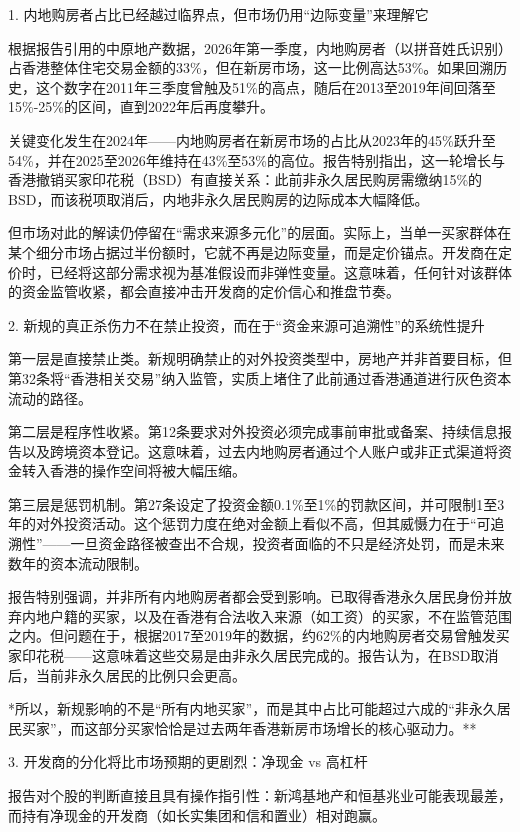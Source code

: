 \documentclass[11pt]{ctexart}
\begin{document}
1. 内地购房者占比已经越过临界点，但市场仍用“边际变量”来理解它

根据报告引用的中原地产数据，2026年第一季度，内地购房者（以拼音姓氏识别）占香港整体住宅交易金额的33\%，但在新房市场，这一比例高达53\%。如果回溯历史，这个数字在2011年三季度曾触及51\%的高点，随后在2013至2019年间回落至15\%-25\%的区间，直到2022年后再度攀升。

关键变化发生在2024年——内地购房者在新房市场的占比从2023年的45\%跃升至54\%，并在2025至2026年维持在43\%至53\%的高位。报告特别指出，这一轮增长与香港撤销买家印花税（BSD）有直接关系：此前非永久居民购房需缴纳15\%的BSD，而该税项取消后，内地非永久居民购房的边际成本大幅降低。

但市场对此的解读仍停留在“需求来源多元化”的层面。实际上，当单一买家群体在某个细分市场占据过半份额时，它就不再是边际变量，而是定价锚点。开发商在定价时，已经将这部分需求视为基准假设而非弹性变量。这意味着，任何针对该群体的资金监管收紧，都会直接冲击开发商的定价信心和推盘节奏。

2. 新规的真正杀伤力不在禁止投资，而在于“资金来源可追溯性”的系统性提升

第一层是直接禁止类。新规明确禁止的对外投资类型中，房地产并非首要目标，但第32条将“香港相关交易”纳入监管，实质上堵住了此前通过香港通道进行灰色资本流动的路径。

第二层是程序性收紧。第12条要求对外投资必须完成事前审批或备案、持续信息报告以及跨境资本登记。这意味着，过去内地购房者通过个人账户或非正式渠道将资金转入香港的操作空间将被大幅压缩。

第三层是惩罚机制。第27条设定了投资金额0.1\%至1\%的罚款区间，并可限制1至3年的对外投资活动。这个惩罚力度在绝对金额上看似不高，但其威慑力在于“可追溯性”——一旦资金路径被查出不合规，投资者面临的不只是经济处罚，而是未来数年的资本流动限制。

报告特别强调，并非所有内地购房者都会受到影响。已取得香港永久居民身份并放弃内地户籍的买家，以及在香港有合法收入来源（如工资）的买家，不在监管范围之内。但问题在于，根据2017至2019年的数据，约62\%的内地购房者交易曾触发买家印花税——这意味着这些交易是由非永久居民完成的。报告认为，在BSD取消后，当前非永久居民的比例只会更高。

*所以，新规影响的不是“所有内地买家”，而是其中占比可能超过六成的“非永久居民买家”，而这部分买家恰恰是过去两年香港新房市场增长的核心驱动力。**

3. 开发商的分化将比市场预期的更剧烈：净现金 vs 高杠杆

报告对个股的判断直接且具有操作指引性：新鸿基地产和恒基兆业可能表现最差，而持有净现金的开发商（如长实集团和信和置业）相对跑赢。
\end{document}
